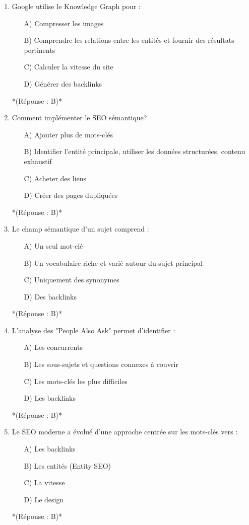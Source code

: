 \documentclass[12pt,a4paper,twoside]{report}
\begin{document}
\begin{enumerate}
\item Google utilise le Knowledge Graph pour :
\begin{itemize}
\item[A)] Compresser les images
\item[B)] Comprendre les relations entre les entités et fournir des résultats pertinents
\item[C)] Calculer la vitesse du site
\item[D)] Générer des backlinks
\end{itemize}
*(Réponse : B)*

\item Comment implémenter le SEO sémantique?
\begin{itemize}
\item[A)] Ajouter plus de mots-clés
\item[B)] Identifier l'entité principale, utiliser les données structurées, contenu exhaustif
\item[C)] Acheter des liens
\item[D)] Créer des pages dupliquées
\end{itemize}
*(Réponse : B)*

\item Le champ sémantique d'un sujet comprend :
\begin{itemize}
\item[A)] Un seul mot-clé
\item[B)] Un vocabulaire riche et varié autour du sujet principal
\item[C)] Uniquement des synonymes
\item[D)] Des backlinks
\end{itemize}
*(Réponse : B)*

\item L'analyse des "People Also Ask" permet d'identifier :
\begin{itemize}
\item[A)] Les concurrents
\item[B)] Les sous-sujets et questions connexes à couvrir
\item[C)] Les mots-clés les plus difficiles
\item[D)] Les backlinks
\end{itemize}
*(Réponse : B)*

\item Le SEO moderne a évolué d'une approche centrée sur les mots-clés vers :
\begin{itemize}
\item[A)] Les backlinks
\item[B)] Les entités (Entity SEO)
\item[C)] La vitesse
\item[D)] Le design
\end{itemize}
*(Réponse : B)*


\end{enumerate}
\end{document}
